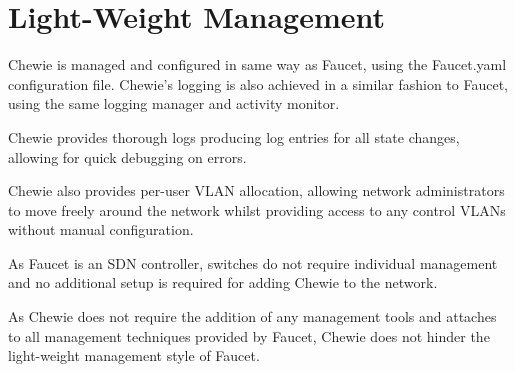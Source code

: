 \section{Light-Weight Management}
Chewie is managed and configured in same way as Faucet, using the Faucet.yaml configuration file. Chewie's logging is also achieved in a similar fashion to Faucet, using the same logging manager and activity monitor.

Chewie provides thorough logs producing log entries for all state changes, allowing for quick debugging on errors.

Chewie also provides per-user VLAN allocation, allowing network administrators to move freely around the network whilst providing access to any control VLANs without manual configuration.

As Faucet is an SDN controller, switches do not require individual management and no additional setup is required for adding Chewie to the network. 

As Chewie does not require the addition of any management tools and attaches to all management techniques provided by Faucet, Chewie does not hinder the light-weight management style of Faucet.